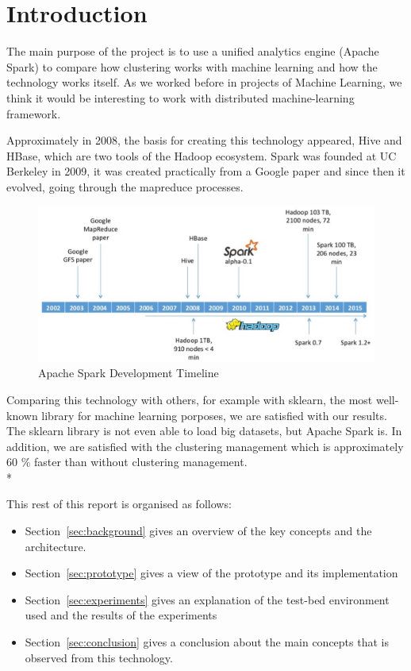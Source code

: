 \section{Introduction}
\label{sec:introduction}


The main purpose of the project is to use a unified analytics engine (Apache Spark) to compare how clustering works with machine learning and how the technology works itself. As we worked before in projects of Machine Learning, we think it would be interesting to work with distributed machine-learning framework.


Approximately in 2008, the basis for creating this technology appeared, Hive and HBase, which are two tools of the Hadoop ecosystem.  
Spark was founded at UC Berkeley in 2009, it was created practically from a Google paper and since then it evolved, going through the mapreduce processes.



\noindent
\begin{figure}[H]
	\centering
	\includegraphics[scale=0.3]{figs/TimelineSpark.jpg}
	\caption{Apache Spark Development Timeline}
	\label{fig:timeline}
\end{figure}

Comparing this technology with others, for example with sklearn, the most well-known library for machine learning porposes, we are satisfied with our results. The sklearn library is not even able to load big datasets, but Apache Spark is. In addition, we are satisfied with the clustering management which is approximately 60 \% faster than without clustering management. \\*

\noindent

This rest of this report is organised as follows:

\begin{itemize}


\item Section~\ref{sec:background} gives an overview of the key concepts and the architecture.

\item Section~\ref{sec:prototype} gives a view of the prototype and its implementation

\item Section~\ref{sec:experiments} gives an explanation of the test-bed environment used and the results of the experiments

\item Section~\ref{sec:conclusion} gives a conclusion about the main concepts that is observed from this technology.

\end{itemize}
\noindent